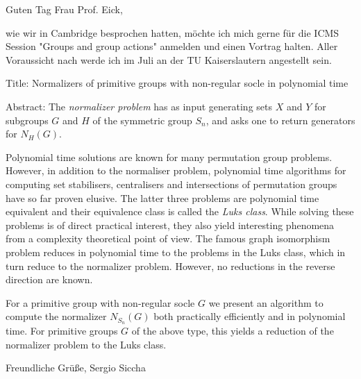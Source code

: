 Guten Tag Frau Prof. Eick,

wie wir in Cambridge besprochen hatten, möchte ich mich gerne für die
ICMS Session "Groups and group actions" anmelden und einen Vortrag
halten. Aller Voraussicht nach werde ich im Juli an der TU
Kaiserslautern angestellt sein.

Title:
Normalizers of primitive groups with non-regular socle in polynomial time

Abstract:
The \emph{normalizer problem} has as input generating sets $X$ and
$Y$ for subgroups $G$ and $H$ of the symmetric group $S_n$, and asks
one to return generators for $N_H(G)$.

Polynomial time solutions are known for many permutation group
problems. However, in addition to the normaliser problem, polynomial
time algorithms for computing set stabilisers, centralisers and
intersections of permutation groups have so far proven elusive. The
latter three problems are polynomial time equivalent and their
equivalence class is called the \emph{Luks class}. While solving these
problems is of direct practical interest, they also yield interesting
phenomena from a complexity theoretical point of view. The famous
graph isomorphism problem reduces in polynomial time to the problems
in the Luks class, which in turn reduce to the normalizer problem.
However, no reductions in the reverse direction are known.

For a primitive group with non-regular socle $G$ we present an
algorithm to compute the normalizer $N_{S_n}(G)$ both practically
efficiently and in polynomial time. For primitive groups $G$ of the
above type, this yields a reduction of the normalizer problem to the
Luks class.

Freundliche Grüße,
Sergio Siccha
